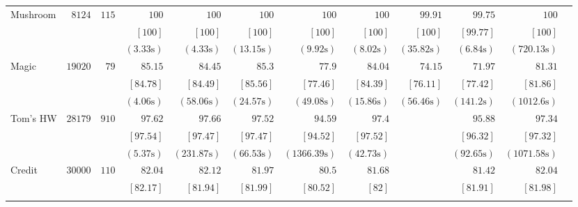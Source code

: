 \begin{table*}[h]
\begin{center}
\begin{tabular}{l  r  r r r r r r r rrr}
			{ Mushroom}   & $  8124 $  & $  115 $  & $   100 $    & $   100 $    & $   100 $    & $   100 $    & $   100 $    & $   99.91  $    & $   99.75  $    & $   100 $   \\ & & 
			& $  [ 100] $    & $  [ 100] $    & $  [ 100] $    & $  [ 100] $    & $  [ 100] $    & $  [ 100] $    & $  [ 99.77 ] $    & $  [ 100] $   \\ & & 
			& $  ( 3.33 \text{s} ) $    & $  ( 4.33 \text{s} ) $    & $  ( 13.15 \text{s} ) $    & $  ( 9.92 \text{s} ) $    & $  ( 8.02 \text{s} ) $    & $  ( 35.82 \text{s} ) $    & $  ( 6.84 \text{s} ) $    & $  ( 720.13 \text{s} ) $   \\[.1cm] 
			{ Magic}   & $  19020 $  & $  79 $  & $   85.15  $    & $   84.45  $    & $   85.3  $    & $   77.9  $    & $   84.04  $    & $   74.15  $    & $   71.97  $    & $   81.31  $   \\ & & 
			& $  [ 84.78 ] $    & $  [ 84.49 ] $    & $  [ 85.56 ] $    & $  [ 77.46 ] $    & $  [ 84.39 ] $    & $  [ 76.11 ] $    & $  [ 77.42 ] $    & $  [ 81.86 ] $   \\ & & 
			& $  ( 4.06 \text{s} ) $    & $  ( 58.06 \text{s} ) $    & $  ( 24.57 \text{s} ) $    & $  ( 49.08 \text{s} ) $    & $  ( 15.86 \text{s} ) $    & $  ( 56.46 \text{s} ) $    & $  ( 141.2 \text{s} ) $    & $  ( 1012.6 \text{s} ) $   \\[.1cm] 
			{ Tom's HW}   & $  28179 $  & $  910 $  & $   97.62  $    & $   97.66  $    & $   97.52  $    & $   94.59  $    & $   97.4  $    &   \multicolumn{1}{c}{\multirow{3}{*}{\textemdash}}       & $   95.88  $    & $   97.34  $   \\ & & 
			& $  [ 97.54 ] $    & $  [ 97.47 ] $    & $  [ 97.47 ] $    & $  [ 94.52 ] $    & $  [ 97.52 ] $    &       & $  [ 96.32 ] $    & $  [ 97.32 ] $   \\ & & 
			& $  ( 5.37 \text{s} ) $    & $  ( 231.87 \text{s} ) $    & $  ( 66.53 \text{s} ) $    & $  ( 1366.39 \text{s} ) $    & $  ( 42.73 \text{s} ) $    &       & $  ( 92.65 \text{s} ) $    & $  ( 1071.58 \text{s} ) $   \\[.1cm] 
			{ Credit}   & $  30000 $  & $  110 $  & $   82.04  $    & $   82.12  $    & $   81.97  $    & $   80.5  $    & $   81.68  $    &   \multicolumn{1}{c}{\multirow{3}{*}{\textemdash}}       & $   81.42  $    & $   82.04  $   \\ & & 
			& $  [ 82.17 ] $    & $  [ 81.94 ] $    & $  [ 81.99 ] $    & $  [ 80.52 ] $    & $  [ 82] $    &       & $  [ 81.91 ] $    & $  [ 81.98 ] $   \\ & & 

\end{tabular}
\end{center}
\end{table*}
